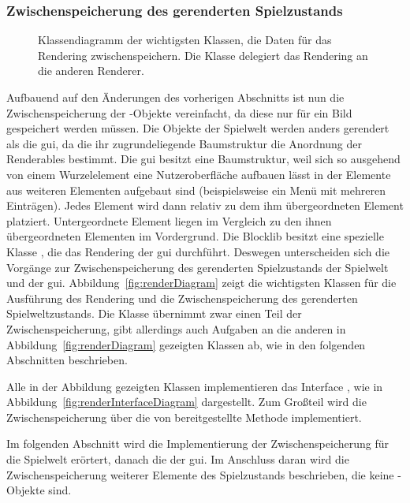 \subsubsection{Zwischenspeicherung des gerenderten Spielzustands}\label{sec:saveRenderState}
\begin{figure}
	\centering
	
	\caption[Klassendiagramm der wichtigsten Klassen, die Daten für das Rendering zwischenspeichern.]{Klassendiagramm der wichtigsten Klassen, die Daten für das Rendering zwischenspeichern. Die Klasse  delegiert das Rendering an die anderen Renderer.}\label{fig:renderDiagram}
\end{figure}
Aufbauend auf den Änderungen des vorherigen Abschnitts ist nun die Zwischenspeicherung der -Objekte vereinfacht, da diese nur für ein Bild gespeichert werden müssen. Die Objekte der Spielwelt werden anders gerendert als die \ac{gui}, da die ihr zugrundeliegende Baumstruktur die Anordnung der Renderables bestimmt. Die \ac{gui} besitzt eine Baumstruktur, weil sich so ausgehend von einem Wurzelelement eine Nutzeroberfläche aufbauen lässt in der Elemente aus weiteren Elementen aufgebaut sind (beispielsweise ein Menü mit mehreren Einträgen). Jedes Element wird dann relativ zu dem ihm übergeordneten Element platziert. Untergeordnete Element liegen im Vergleich zu den ihnen übergeordneten Elementen im Vordergrund. Die Blocklib besitzt eine spezielle Klasse , die das Rendering der \ac{gui} durchführt. Deswegen unterscheiden sich die Vorgänge zur Zwischenspeicherung des gerenderten Spielzustands der Spielwelt und der \ac{gui}. Abbildung~\vref{fig:renderDiagram} zeigt die wichtigsten Klassen für die Ausführung des Rendering und die Zwischenspeicherung des gerenderten Spielweltzustands. Die Klasse  übernimmt zwar einen Teil der Zwischenspeicherung, gibt allerdings auch Aufgaben an die anderen in Abbildung~\vref{fig:renderDiagram} gezeigten Klassen ab, wie in den folgenden Abschnitten beschrieben.

Alle in der Abbildung gezeigten Klassen implementieren das Interface , wie in Abbildung~\vref{fig:renderInterfaceDiagram} dargestellt. Zum Großteil wird die Zwischenspeicherung über die von  bereitgestellte Methode  implementiert.

Im folgenden Abschnitt wird die Implementierung der Zwischenspeicherung für die Spielwelt erörtert, danach die der \ac{gui}. Im Anschluss daran wird die Zwischenspeicherung weiterer Elemente des Spielzustands beschrieben, die keine -Objekte sind.

